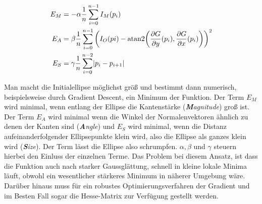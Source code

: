\begin{equation}
\begin{aligned}
E_M &= -\alpha\frac{1}{n}\sum_{i=0}^{n-1}I_M(p_i) \\
E_A &= \beta\frac{1}{n}\sum_{i=0}^{n-1}\left(I_O(pi) - \text{atan2}{\left(\frac{\partial G}{\partial y}(p_i), \frac{\partial G}{\partial x}(p_i)\right)}\right)^2 \\
E_S &= \gamma\frac{1}{n}\sum_{i=0}^{n-2}\lvert p_i - p_{i+1}\rvert
\end{aligned}
\end{equation}

Man macht die Initialellipse möglichst größ und bestimmt dann numerisch, beispielsweise durch Gradient Descent, ein Minimum der Funktion. Der Term $E_M$ wird minimal, wenn entlang der Ellipse die Kantenstärke (\textit{\textbf{M}agnitude}) groß ist. Der Term $E_A$ wird minimal wenn die Winkel der Normalenvektoren ähnlich zu denen der Kanten sind (\textit{\textbf{A}ngle}) und $E_S$ wird minimal, wenn die Distanz aufeinanderfolgender Ellipsepunkte klein wird, also die Ellipse als ganzes klein wird (\textit{\textbf{S}ize}). Der Term lässt die Ellipse also schrumpfen. $\alpha, \beta$ und $\gamma$ steuern hierbei den Einluss der einzelnen Terme. Das Problem bei diesem Ansatz, ist dass die Funktion auch nach starker Gaussglättung, schnell in kleine lokale Minima läuft, obwohl ein wesentlicher stärkeres Minimum in näherer Umgebung wäre. Darüber hinaus muss für ein robustes Optimierungsverfahren der Gradient und im Besten Fall sogar die Hesse-Matrix zur Verfügung gestellt werden. 



